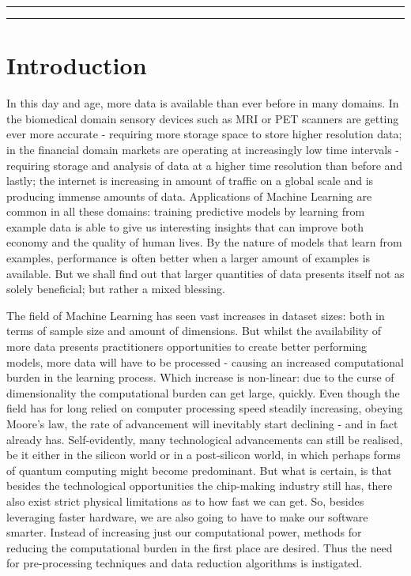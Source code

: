 \documentclass{article}
\begin{document}
\hrule
\begin{abstract}
\end{abstract}
\hrule
\begin{quote}
    
\end{quote}

\tableofcontents
\section{Introduction}
In this day and age, more data is available than ever before in many domains. In the biomedical domain sensory devices such as MRI or PET scanners are getting ever more accurate - requiring more storage space to store higher resolution data; in the financial domain markets are operating at increasingly low time intervals - requiring storage and analysis of data at a higher time resolution than before and lastly; the internet is increasing in amount of traffic on a global scale and is producing immense amounts of data. Applications of Machine Learning are common in all these domains: training predictive models by learning from example data is able to give us interesting insights that can improve both economy and the quality of human lives. By the nature of models that learn from examples, performance is often better when a larger amount of examples is available. But we shall find out that larger quantities of data presents itself not as solely beneficial; but rather a mixed blessing.

The field of Machine Learning has seen vast increases in dataset sizes: both in terms of sample size and amount of dimensions. But whilst the availability of more data presents practitioners opportunities to create better performing models, more data will have to be processed - causing an increased computational burden in the learning process. Which increase is non-linear: due to the curse of dimensionality the computational burden can get large, quickly. Even though the field has for long relied on computer processing speed steadily increasing, obeying Moore's law, the rate of advancement will inevitably start declining - and in fact already has. Self-evidently, many technological advancements can still be realised, be it either in the silicon world or in a post-silicon world, in which perhaps forms of quantum computing might become predominant. But what is certain, is that besides the technological opportunities the chip-making industry still has, there also exist strict physical limitations as to how fast we can get. So, besides leveraging faster hardware, we are also going to have to make our software smarter. Instead of increasing just our computational power, methods for reducing the computational burden in the first place are desired. Thus the need for pre-processing techniques and data reduction algorithms is instigated.
\end{document}

